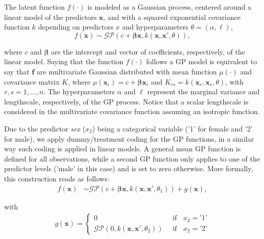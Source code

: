 \documentclass[onecolumn,a4paper,11pt]{article}
\begin{document}
The latent function $f(\cdot)$ is modeled as a Gaussian process, centered around a linear model of the predictors $\bm{x}$, and with a squared exponential covariance function $k$ depending on predictors $x$ and hyperparameters $\theta=(\alpha,\ell)$,
%
\begin{equation*} 
f(\bm{x}) \sim \mathcal{GP}(c + \bm{\beta}\bm{x}, k(\bm{x},\bm{x}', \theta)),
\end{equation*}

\noindent where $c$ and $\bm{\beta}$ are the intercept and vector of coefficients, respectively, of the linear model.  Saying that the function $f(\cdot)$ follows a GP model is equivalent to say that $\bm{f}$ are multivariate Gaussian distributed with mean function $\mu(\cdot)$ and covariance matrix $K$, where $\mu(\bm{x}_i)=c + \bm{\beta}\bm{x}_i$ and $K_{rs}=k(\bm{x}_r,\bm{x}_s,\theta)$, with $r,s=1,\dots,n$.  The hyperparameters $\alpha$ and $\ell$ represent the marginal variance and lengthscale, respectively, of the GP process. Notice that a scalar lengthscale is considered in the multivariate covariance function assuming an isotropic function.

Due to the predictor \textit{sex} ($x_2$) being a categorical variable ('1' for female and '2' for male), we apply dummy/treatment coding for the GP functions, in a similar way such coding is applied in linear models. A general mean GP function is defined for all observations, while a second GP function only applies to one of the predictor levels ('male' in this case) and is set to zero otherwise. More formally, this construction reads as follows:
%
\begin{align} 
f(\bm{x}) &\sim \mathcal{GP}(c + \bm{\beta}\bm{x}, k(\bm{x},\bm{x}', \theta_1)) + g(\bm{x}), \label{ch5_eq_gpml1}
\end{align}

\noindent with
%
\begin{align} \label{ch5_eq_gpml2}
g(\bm{x}) =
\left\{
	\begin{array}{ll}
		0 & \;\; \mbox{if } \;\; x_2\!=\!\text{'}1\text{'}  \\
		\mathcal{GP}(0, k(\bm{x},\bm{x}', \theta_2))  & \;\; \mbox{if } \;\; x_2\!=\!\text{'}2\text{'} 
	\end{array}
\right.
\end{align}
%
%

\end{document}
